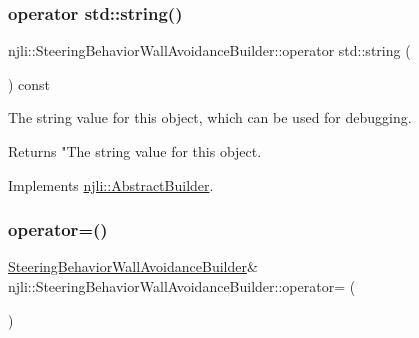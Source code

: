 \subsubsection{\texorpdfstring{operator std\+::string()}{operator std::string()}}
{\footnotesize\ttfamily njli\+::\+Steering\+Behavior\+Wall\+Avoidance\+Builder\+::operator std\+::string (\begin{DoxyParamCaption}{ }\end{DoxyParamCaption}) const\hspace{0.3cm}{\ttfamily [virtual]}}

The string value for this object, which can be used for debugging.

\begin{DoxyReturn}{Returns}
"The string value for this object. 
\end{DoxyReturn}


Implements \mbox{\hyperlink{classnjli_1_1_abstract_builder_a3e6e553e06d1ca30517ad5fb0bd4d000}{njli\+::\+Abstract\+Builder}}.

\mbox{\label{classnjli_1_1_steering_behavior_wall_avoidance_builder_a9191cc6dd8ba06051c04e13cac80283f}} 
\subsubsection{\texorpdfstring{operator=()}{operator=()}}
{\footnotesize\ttfamily \mbox{\hyperlink{classnjli_1_1_steering_behavior_wall_avoidance_builder}{Steering\+Behavior\+Wall\+Avoidance\+Builder}}\& njli\+::\+Steering\+Behavior\+Wall\+Avoidance\+Builder\+::operator= (\begin{DoxyParamCaption}\item[{const \mbox{\hyperlink{classnjli_1_1_steering_behavior_wall_avoidance_builder}{Steering\+Behavior\+Wall\+Avoidance\+Builder}} \&}]{ }\end{DoxyParamCaption})\hspace{0.3cm}{\ttfamily [protected]}}

\mbox{\label{classnjli_1_1_steering_behavior_wall_avoidance_builder_a784cb4aaf2b005480cf1b398f87a04ed}} 
